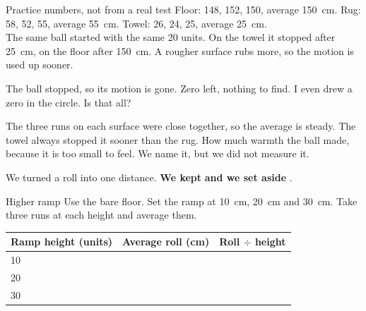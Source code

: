 \begin{worked}{Practice numbers, not from a real test}
Floor: 148, 152, 150, average 150~cm. Rug: 58, 52, 55, average 55~cm. Towel: 26, 24, 25, average 25~cm.\\
The same ball started with the same 20 units. On the towel it stopped after 25~cm, on the floor after 150~cm. A rougher surface rubs more, so the motion is used up sooner.
\end{worked}

\begin{center}
\end{center}

\begin{multix}[hmm]\multixbot[hmm]\tcblower
The ball stopped, so its motion is gone. Zero left, nothing to find. I even drew a zero in the circle. Is that all?
\end{multix}

{The three runs on each surface were close together, so the average is steady. The towel always stopped it sooner than the rug.}
{How much warmth the ball made, because it is too small to feel. We name it, but we did not measure it.}

\begin{keepbox}
We turned a roll into one distance. \textbf{We kept} \wline[3.4cm] \textbf{and we set aside} \wline[3.4cm].
\end{keepbox}

\begin{tryit}{Higher ramp}
Use the bare floor. Set the ramp at 10~cm, 20~cm and 30~cm. Take three runs at each height and average them.\par\medskip
\renewcommand{\arraystretch}{1.6}
\begin{tabular}{|l|c|c|}
\hline
\textbf{Ramp height (units)} & \textbf{Average roll (cm)} & \textbf{Roll $\div$ height}\\ \hline
10 & & \\ \hline
20 & & \\ \hline
30 & & \\ \hline
\end{tabular}
\end{tryit}

